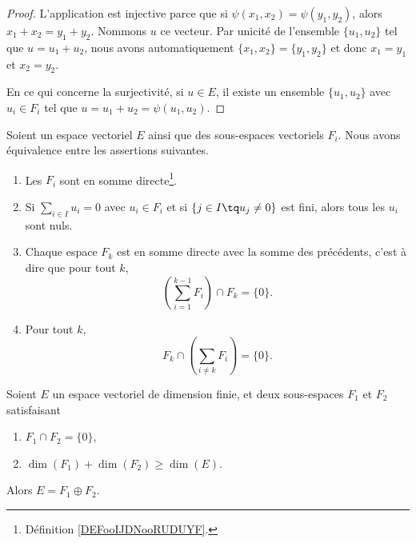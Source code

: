 \begin{proof}
	L'application est injective parce que si \( \psi(x_1,x_2)=\psi(y_1,y_2)\), alors \( x_1+x_2=y_1+y_2\). Nommons \(u\) ce vecteur. Par unicité de l'ensemble \(  \{ u_1,u_2 \} \) tel que \( u=u_1+u_2\), nous avons automatiquement \( \{ x_1,x_2 \}=\{ y_1,y_2 \}\) et donc \( x_1=y_1\) et \( x_2=y_2\).

	En ce qui concerne la surjectivité, si \( u\in E\), il existe un ensemble \( \{ u_1,u_2 \}\) avec \( u_i\in F_i\) tel que \( u=u_1+u_2=\psi(u_1,u_2)\).
\end{proof}


\begin{lemma}         \label{LEMooDQMQooInVVDY}
	Soient un espace vectoriel \( E\) ainsi que des sous-espaces vectoriels \( F_i\). Nous avons équivalence entre les assertions suivantes.

	\begin{enumerate}
		\item
		      Les \( F_i\) sont en somme directe\footnote{Définition \ref{DEFooIJDNooRUDUYF}.}.
		\item
		      Si \( \sum_{i\in I}u_i=0\) avec \( u_i\in F_i\) et si \( \{ j\in I\tq u_j\neq 0 \}\) est fini, alors tous les \( u_i\) sont nuls.
		\item
		      Chaque espace \( F_k\) est en somme directe avec la somme des précédents, c'est à dire que pour tout \( k\),
		      \begin{equation}
			      \left( \sum_{i=1}^{k-1}F_i \right)\cap F_k=\{ 0 \}.
		      \end{equation}
		\item   \label{ITEMooPLXGooCOQgen}
		      Pour tout \( k\),
		      \begin{equation}
			      F_k\cap\left( \sum_{i\neq k}F_i \right)=\{ 0 \}.
		      \end{equation}
	\end{enumerate}
\end{lemma}

\begin{proposition}               \label{PROPooCASNooEqisqa}
	Soient \( E\) un espace vectoriel de dimension finie, et deux sous-espaces \( F_1\) et \( F_2\) satisfaisant
	\begin{enumerate}
		\item
		      \( F_1\cap F_2=\{ 0 \}\),
		\item
		      \( \dim(F_1)+\dim(F_2)\geq \dim(E)\).
	\end{enumerate}
	Alors \( E=F_1\oplus F_2\).
\end{proposition}

